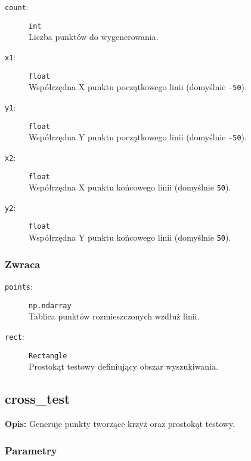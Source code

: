 \documentclass[12pt]{article}
\begin{document}
\begin{description}
    \item[\texttt{count}:] \texttt{int} \\
    Liczba punktów do wygenerowania.
    
    \item[\texttt{x1}:] \texttt{float} \\
    Współrzędna X punktu początkowego linii (domyślnie \texttt{-50}).
    
    \item[\texttt{y1}:] \texttt{float} \\
    Współrzędna Y punktu początkowego linii (domyślnie \texttt{-50}).
    
    \item[\texttt{x2}:] \texttt{float} \\
    Współrzędna X punktu końcowego linii (domyślnie \texttt{50}).
    
    \item[\texttt{y2}:] \texttt{float} \\
    Współrzędna Y punktu końcowego linii (domyślnie \texttt{50}).
\end{description}

\subsubsection{Zwraca}

\begin{description}
    \item[\texttt{points}:] \texttt{np.ndarray} \\
    Tablica punktów rozmieszczonych wzdłuż linii.
    
    \item[\texttt{rect}:] \texttt{Rectangle} \\
    Prostokąt testowy definiujący obszar wyszukiwania.
\end{description}

\subsection{cross\_test}

\textbf{Opis:} Generuje punkty tworzące krzyż oraz prostokąt testowy.

\subsubsection{Parametry}
\end{document}
